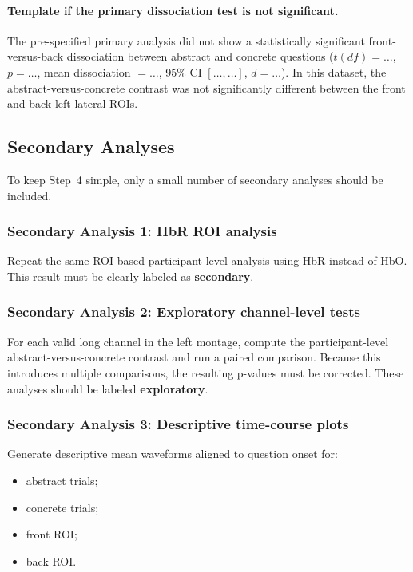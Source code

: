 \paragraph{Template if the primary dissociation test is not significant.}
The pre-specified primary analysis did not show a statistically significant front-versus-back dissociation
between abstract and concrete questions
(\(t(df)=\ldots\), \(p=\ldots\), mean dissociation \(=\ldots\), 95\% CI \([\ldots,\ldots]\), \(d=\ldots\)).
In this dataset, the abstract-versus-concrete contrast was not significantly different between the
front and back left-lateral ROIs.

\subsection{Secondary Analyses}
To keep Step~4 simple, only a small number of secondary analyses should be included.

\subsubsection{Secondary Analysis 1: HbR ROI analysis}
Repeat the same ROI-based participant-level analysis using HbR instead of HbO.
This result must be clearly labeled as \textbf{secondary}.

\subsubsection{Secondary Analysis 2: Exploratory channel-level tests}
For each valid long channel in the left montage, compute the participant-level abstract-versus-concrete
contrast and run a paired comparison.
Because this introduces multiple comparisons, the resulting p-values must be corrected.
These analyses should be labeled \textbf{exploratory}.

\subsubsection{Secondary Analysis 3: Descriptive time-course plots}
Generate descriptive mean waveforms aligned to question onset for:
\begin{itemize}
    \item abstract trials;
    \item concrete trials;
    \item front ROI;
    \item back ROI.
\end{itemize}

